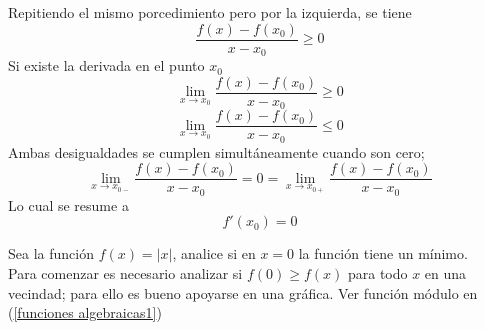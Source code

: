\documentclass[10pt,twoside]{SelfArx} %
\begin{document}
 Repitiendo el mismo porcedimiento pero por la izquierda, se tiene
 \begin{equation}
 \dfrac{ f(x)-f(x_{0})}{x-x_{0}}\geq0
 \end{equation}
 Si existe la derivada en el punto $ x_{0} $
 \begin{equation}
 \lim\limits_{x\rightarrow x_{0}} \dfrac{ f(x)-f(x_{0})}{x-x_{0}}\geq0
 \end{equation}
\begin{equation}
 \lim\limits_{x\rightarrow x_{0}} \dfrac{ f(x)-f(x_{0})}{x-x_{0}}\leq0
\end{equation} 
 Ambas desigualdades se cumplen simult\'aneamente cuando son cero; 
 \begin{equation}
 \lim\limits_{x\rightarrow x_{0-}} \dfrac{ f(x)-f(x_{0})}{x-x_{0}}=0=\lim\limits_{x\rightarrow x_{0+}} \dfrac{ f(x)-f(x_{0})}{x-x_{0}}
 \end{equation}
 Lo cual se resume a
 \begin{equation}
 f'(x_{0})=0
 \end{equation}
 
 \begin{ejemplo}
 	Sea la funci\'on $ f(x)=|x| $, analice si en $ x=0 $ la funci\'on tiene un m\'inimo.\\
 	Para comenzar es necesario analizar si $ f(0)\geq f(x) $ para todo $ x $ en una vecindad; para ello es bueno apoyarse en una gr\'afica. Ver funci\'on m\'odulo en (\ref{funciones algebraicas1})
 \end{ejemplo} 
 
\end{document}
